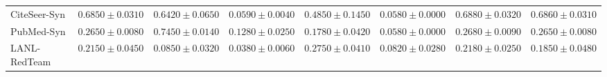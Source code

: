 \documentclass[applsci,article,submit,moreauthors,pdftex]{Definitions/mdpi}
\begin{document}
\begin{table}[H]
\begin{tabularx}{\textwidth}{lXXXXXXX}
CiteSeer-Syn & $0.6850 \pm 0.0310$ & $0.6420 \pm 0.0650$ & $0.0590 \pm 0.0040$ & $0.4850 \pm 0.1450$ & $0.0580 \pm 0.0000$ & $\mathbf{0.6880 \pm 0.0320}$ & $0.6860 \pm 0.0310$ \\
PubMed-Syn & $0.2650 \pm 0.0080$ & $\mathbf{0.7450 \pm 0.0140}$ & $0.1280 \pm 0.0250$ & $0.1780 \pm 0.0420$ & $0.0580 \pm 0.0000$ & $0.2680 \pm 0.0090$ & $0.2650 \pm 0.0080$ \\\midrule
LANL-RedTeam & $0.2150 \pm 0.0450$ & $0.0850 \pm 0.0320$ & $0.0380 \pm 0.0060$ & $\mathbf{0.2750 \pm 0.0410}$ & $0.0820 \pm 0.0280$ & $0.2180 \pm 0.0250$ & $0.1850 \pm 0.0480$ \\\bottomrule
\end{tabularx}
\end{table}
\end{document}
